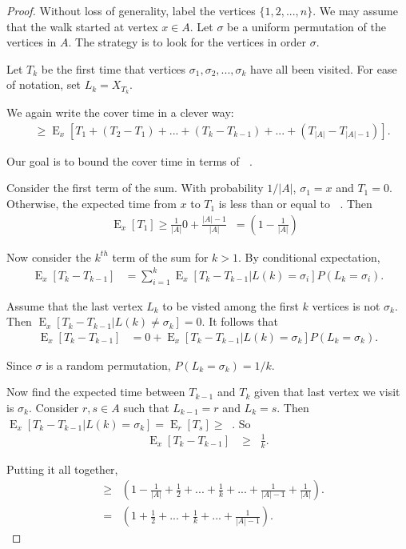 \documentclass[12pt]{article}
\theoremstyle{definition}
\DeclareMathOperator{\E}{\mathrm{E}}		     %
\DeclareMathOperator{\tcov}{t_\textrm{cov}}      %
\DeclareMathOperator{\tmina}{t_\textrm{min}^A}   %
\begin{document}
\begin{proof}
Without loss of generality, label the vertices $\{1, 2, ..., n\}$.
We may assume that the walk started at vertex $x \in A$.
Let $\sigma$ be a uniform permutation of the vertices in $A$.
The strategy is to look for the vertices in order $\sigma$.

Let $T_k$ be the first time that vertices $\sigma_1, \sigma_2, ..., \sigma_k$
have all been visited.
For ease of notation, set $L_k = X_{T_k}$.

We again write the cover time in a clever way:
\begin{align}
\tcov &\geq \E_x[T_1 + (T_2 - T_1) + ... + 
(T_k - T_{k-1}) + ... + (T_{|A|} - T_{|A|-1})] . \nonumber
\end{align}

Our goal is to bound the cover time in terms of $\tmina$.

Consider the first term of the sum.
With probability $1/|A|$, $\sigma_1 = x$ and $T_1=0$.
Otherwise, the expected time from $x$ to $T_1$ is less than or equal to
$\tmina$.
Then
\begin{align}
\E_x[T_1] \geq \frac{1}{|A|}0 + \frac{|A| -1}{|A|} \tmina
= \left(1 - \frac{1}{|A|} \right) \tmina \nonumber
\end{align}

Now consider the $k^{th}$ term of the sum for $k > 1$.
By conditional expectation,
\begin{align}
\E_x[T_k - T_{k-1}] &=
\sum_{i=1}^k \E_x[T_k - T_{k-1} | L(k) = \sigma_i]
P(L_k = \sigma_i). \nonumber 
\end{align}

Assume that the last vertex $L_k$ to be visted among the first
$k$ vertices is not $\sigma_k$.
Then $\E_x[T_k-T_{k-1}|L(k) \neq \sigma_k] = 0$.
It follows that
\begin{align}
\E_x[T_k - T_{k-1}] &= 0 +
\E_x[T_k - T_{k-1} | L(k) = \sigma_k]
P(L_k = \sigma_k). \nonumber 
\end{align}

Since $\sigma$ is a random permutation, $P(L_k = \sigma_k) = 1/k$.

Now find the expected time between $T_{k-1}$ and $T_{k}$
given that last vertex we visit is $\sigma_k$.
Consider $r, s \in A$ such that $L_{k-1} = r$ and $L_k = s$.
Then $\E_x[T_k - T_{k-1} | L(k) = \sigma_k] = \E_r[T_s] \geq \tmina$.
So
\begin{align}
\E_x[T_k - T_{k-1}] &\geq
\tmina \frac{1}{k}. \nonumber 
\end{align}

Putting it all together,
\begin{align}
\tcov &\geq \tmina \left( 1 - \frac{1}{|A|}+ \frac{1}{2} + ... + \frac{1}{k} 
+ ... + \frac{1}{|A|-1} + \frac{1}{|A|}\right). \nonumber \\
&= \tmina \left( 1 + \frac{1}{2} + ... + \frac{1}{k} 
+ ... + \frac{1}{|A|-1} \right). \nonumber
\end{align}
\end{proof}
\end{document}
